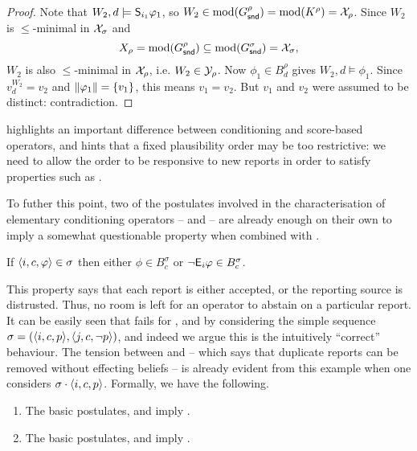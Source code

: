 \begin{proof}
    Note that $W_2, d \models \S_{i_1}{\phi_1}$, so $W_2 \in \mods(G^\rho_\snd)
    = \mods(K^\rho) = \X_\rho$. Since $W_2$ is $\le$-minimal in $\X_\sigma$ and
    \[
        X_\rho = \mods(G^\rho_\snd) \subseteq \mods(G^\sigma_\snd) = \X_\sigma,
    \]
    $W_2$ is also $\le$-minimal in $\X_\rho$, i.e. $W_2 \in \Y_\rho$. Now
    $\phi_1 \in B^\rho_d$ gives $W_2, d \models \phi_1$. Since $v^{W_2}_d =
    v_2$ and $\propmods{\phi_1} = \{v_1\}$, this means $v_1 = v_2$. But $v_1$
    and $v_2$ were assumed to be distinct: contradiction.

\end{proof}

 highlights an important
difference between conditioning and score-based operators, and hints that
a fixed plausibility order may be too restrictive: we
need to allow the order to be responsive to new reports in order to satisfy
properties such as \strongcondsucc{}.

To futher this point, two of the postulates involved in the characterisation of
elementary conditioning operators -- \duprem{} and \incvac{} -- are already
enough on their own to imply a somewhat questionable property when combined
with \strongcondsucc{}.

\begin{axiom}[\decisiveness{}]
    If $\tuple{i, c, \phi} \in \sigma$ then either $\phi \in B^\sigma_c$ or
    $\neg\E_i\phi \in B^\sigma_c$.
\end{axiom}

This property says that each report is either accepted, or the reporting source
is distrusted. Thus, no room is left for an operator to abstain on a particular
report. It can be easily seen that \decisiveness{} fails for \varbasedcond{},
\partbasedcond{} and \scorebasedop{} by considering the simple sequence $\sigma
= (\tuple{i, c, p}, \tuple{j, c, \neg{p}})$, and indeed we argue this is the
intuitively ``correct'' behaviour. The tension between \strongcondsucc{} and
\duprem{} -- which says that duplicate reports can be removed without effecting
beliefs -- is already evident from this example when one considers $\sigma
\concat \tuple{i, c, p}$. Formally, we have the following.

\begin{proposition}\leavevmode
    \begin{enumerate}
        \item\label{kr_item_duprem_strongcondsucc_deciciveness} The basic
            postulates, \duprem{} and \strongcondsucc{} imply \decisiveness{}.
        \item The basic postulates, \incvac{} and \strongcondsucc{} imply
              \decisiveness{}.
    \end{enumerate}
\end{proposition}

